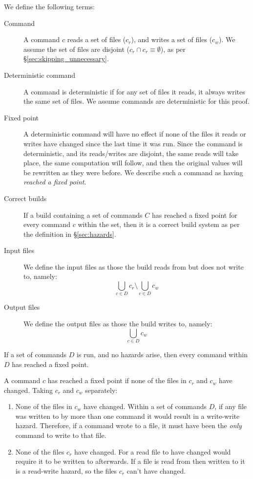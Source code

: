 We define the following terms:

\begin{description}
\item[Command] A command $c$ reads a set of files ($c_r$), and writes a set of files ($c_w$). We assume the set of files are disjoint ($c_r \cap c_r \equiv \emptyset$), as per \S\ref{sec:skipping_unnecessary}.
\item[Deterministic command] A command is deterministic if for any set of files it reads, it always writes the same set of files. We assume commands are deterministic for this proof.
\item[Fixed point] A deterministic command will have no effect if none of the files it reads or writes have changed since the last time it was run. Since the command is deterministic, and its reads/writes are disjoint, the same reads will take place, the same computation will follow, and then the original values will be rewritten as they were before. We describe such a command as having \emph{reached a fixed point}.
\item[Correct builds] If a build containing a set of commands $C$ has reached a fixed point for every command $c$ within the set, then it is a correct build system as per the definition in \S\ref{sec:hazards}.
\item[Input files] We define the input files as those the build reads from but does not write to, namely:
\[
  \bigcup_{c \in D} c_r \setminus \bigcup_{c \in D} c_w
\]
\item[Output files] We define the output files as those the build writes to, namely:
\[
  \bigcup_{c \in D} c_w
\]
\end{description}

\claim If a set of commands $D$ is run, and no hazards arise, then every command within $D$ has reached a fixed point.

\proof A command $c$ has reached a fixed point if none of the files in $c_r$ and $c_w$ have changed. Taking $c_r$ and $c_w$ separately:

\begin{enumerate}
\item None of the files in $c_w$ have changed. Within a set of commands $D$, if any file was written to by more than one command it would result in a write-write hazard. Therefore, if a command wrote to a file, it must have been the \emph{only} command to write to that file.
\item None of the files $c_r$ have changed. For a read file to have changed would require it to be written to afterwards. If a file is read from then written to it is a read-write hazard, so the files $c_r$ can't have changed.
\end{enumerate}

